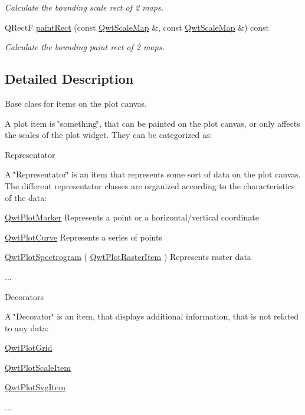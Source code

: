 \begin{DoxyCompactItemize}
\begin{DoxyCompactList}\small\item\em Calculate the bounding scale rect of 2 maps. \end{DoxyCompactList}\item 
Q\-Rect\-F \hyperlink{class_qwt_plot_item_afa05b98fd7ea65ca1ffcb04bb6b4326d}{paint\-Rect} (const \hyperlink{class_qwt_scale_map}{Qwt\-Scale\-Map} \&, const \hyperlink{class_qwt_scale_map}{Qwt\-Scale\-Map} \&) const 
\begin{DoxyCompactList}\small\item\em Calculate the bounding paint rect of 2 maps. \end{DoxyCompactList}\end{DoxyCompactItemize}


\subsection{Detailed Description}
Base class for items on the plot canvas. 

A plot item is \char`\"{}something\char`\"{}, that can be painted on the plot canvas, or only affects the scales of the plot widget. They can be categorized as\-:


\begin{DoxyItemize}
\item Representator\par
 A \char`\"{}\-Representator\char`\"{} is an item that represents some sort of data on the plot canvas. The different representator classes are organized according to the characteristics of the data\-:
\begin{DoxyItemize}
\item \hyperlink{class_qwt_plot_marker}{Qwt\-Plot\-Marker} Represents a point or a horizontal/vertical coordinate
\item \hyperlink{class_qwt_plot_curve}{Qwt\-Plot\-Curve} Represents a series of points
\item \hyperlink{class_qwt_plot_spectrogram}{Qwt\-Plot\-Spectrogram} ( \hyperlink{class_qwt_plot_raster_item}{Qwt\-Plot\-Raster\-Item} ) Represents raster data
\item ...
\end{DoxyItemize}
\end{DoxyItemize}


\begin{DoxyItemize}
\item Decorators\par
 A \char`\"{}\-Decorator\char`\"{} is an item, that displays additional information, that is not related to any data\-:
\begin{DoxyItemize}
\item \hyperlink{class_qwt_plot_grid}{Qwt\-Plot\-Grid}
\item \hyperlink{class_qwt_plot_scale_item}{Qwt\-Plot\-Scale\-Item}
\item \hyperlink{class_qwt_plot_svg_item}{Qwt\-Plot\-Svg\-Item}
\item ...
\end{DoxyItemize}
\end{DoxyItemize}

